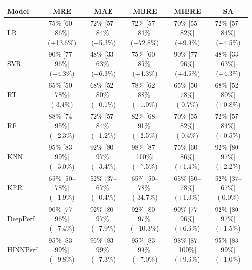 \begin{tabular}{lccccc}
\toprule
Model & MRE & MAE & MBRE & MIBRE & SA \\
\midrule
LR & 75\% [60--86\%] (+13.6\%) & 72\% [57--84\%] (+5.3\%) & 72\% [57--84\%] (+72.8\%) & 70\% [55--82\%] (+9.9\%) & 72\% [57--84\%] (+4.5\%) \\
SVR & 90\% [77--96\%] (+4.3\%) & 48\% [33--63\%] (+6.3\%) & 75\% [60--86\%] (+4.3\%) & 90\% [77--96\%] (+4.5\%) & 48\% [33--63\%] (+4.3\%) \\
RT & 65\% [50--78\%] (-3.4\%) & 68\% [52--80\%] (+0.1\%) & 78\% [62--88\%] (+1.0\%) & 65\% [50--78\%] (-0.7\%) & 68\% [52--80\%] (+0.8\%) \\
RF & 88\% [74--95\%] (+2.3\%) & 72\% [57--84\%] (+1.2\%) & 82\% [68--91\%] (+2.5\%) & 70\% [55--82\%] (-0.4\%) & 72\% [57--84\%] (+0.5\%) \\
KNN & 95\% [83--99\%] (+3.0\%) & 92\% [80--97\%] (+3.4\%) & 98\% [87--100\%] (+7.5\%) & 75\% [60--86\%] (+1.4\%) & 92\% [80--97\%] (+2.2\%) \\
KRR & 65\% [50--78\%] (+1.9\%) & 52\% [37--67\%] (+0.4\%) & 65\% [50--78\%] (-34.7\%) & 65\% [50--78\%] (+1.0\%) & 52\% [37--67\%] (-0.0\%) \\
DeepPerf & 90\% [77--96\%] (+7.4\%) & 92\% [80--97\%] (+7.9\%) & 92\% [80--97\%] (+10.3\%) & 90\% [77--96\%] (+6.6\%) & 92\% [80--97\%] (+1.5\%) \\
HINNPerf & 95\% [83--99\%] (+9.8\%) & 95\% [83--99\%] (+7.3\%) & 95\% [83--99\%] (+7.0\%) & 98\% [87--100\%] (+9.6\%) & 95\% [83--99\%] (+1.0\%) \\
\bottomrule
\end{tabular}
